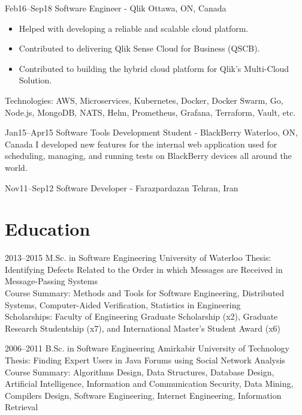 \documentclass[]{cv-style}                     %
\begin{document}
\begin{entrylist}
  \entry
  {\small Feb16--Sep18}
  {Software Engineer - Qlik}
  {Ottawa, ON, Canada}
  {
    \begin{itemize}
      \item Helped with developing a reliable and scalable cloud platform.
      \item Contributed to delivering Qlik Sense Cloud for Business (QSCB).
      \item Contributed to building the hybrid cloud platform for Qlik's Multi-Cloud Solution.
    \end{itemize}
    Technologies: AWS, Microservices, Kubernetes, Docker, Docker Swarm, Go, Node.js, MongoDB, NATS, Helm, Prometheus, Grafana, Terraform, Vault, etc.
   }

  \entry
  {\small Jan15--Apr15}
  {Software Tools Development Student - BlackBerry}
  {Waterloo, ON, Canada}
  {
    I developed new features for the internal web application
    used for scheduling, managing, and running tests on BlackBerry devices all around the world.
  }

  \entry
  {\small Nov11--Sep12}
  {Software Developer - Farazpardazan}
  {Tehran, Iran}
  {}


\end{entrylist}



\newpage
\section{Education}

\begin{entrylist}

  \entry
  {\small 2013--2015}
  {M.Sc. in Software Engineering {\normalfont [GPA: 87.80/100]}}
  {University of Waterloo}
  {Thesis: Identifying Defects Related to the Order in which Messages are Received in Message-Passing Systems \\
   Course Summary: Methods and Tools for Software Engineering, Distributed Systems, Computer-Aided Verification, Statistics in Engineering \\
   Scholarships: Faculty of Engineering Graduate Scholarship (x2), Graduate Research Studentship (x7), and International Master's Student Award (x6)}

  \entry
  {\small 2006--2011}
  {B.Sc. in Software Engineering {\normalfont [GPA: 16.69/20]}}
  {Amirkabir University of Technology}
  {Thesis: Finding Expert Users in Java Forums using Social Network Analysis \\
   Course Summary: Algorithms Design, Data Structures, Database Design, Artificial Intelligence, Information and Communication Security, Data Mining, Compilers Design, Software Engineering, Internet Engineering, Information Retrieval}

\end{entrylist}
\end{document}
